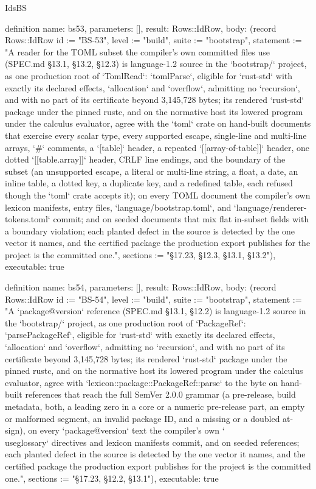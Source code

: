 \begin{lexlean}{IdsBS}
\begin{semanticmodule}
definition{
  name: bs53,
  parameters: [],
  result: Rows::IdRow,
  body: (record Rows::IdRow {id := "BS-53", level := "build", suite := "bootstrap", statement := "A reader for the TOML subset the compiler's own committed files use (SPEC.md §13.1, §13.2, §12.3) is language-1.2 source in the `bootstrap/` project, as one production root of `TomlRead`: `tomlParse`, eligible for `rust-std` with exactly its declared effects, `allocation` and `overflow`, admitting no `recursion`, and with no part of its certificate beyond 3,145,728 bytes; its rendered `rust-std` package under the pinned rustc, and on the normative host its lowered program under the calculus evaluator, agree with the `toml` crate on hand-built documents that exercise every scalar type, every supported escape, single-line and multi-line arrays, `#` comments, a `[table]` header, a repeated `[[array-of-table]]` header, one dotted `[[table.array]]` header, CRLF line endings, and the boundary of the subset (an unsupported escape, a literal or multi-line string, a float, a date, an inline table, a dotted key, a duplicate key, and a redefined table, each refused though the `toml` crate accepts it); on every TOML document the compiler's own lexicon manifests, entry files, `language/bootstrap.toml`, and `language/renderer-tokens.toml` commit; and on seeded documents that mix flat in-subset fields with a boundary violation; each planted defect in the source is detected by the one vector it names, and the certified package the production export publishes for the project is the committed one.", sections := "§17.23, §12.3, §13.1, §13.2"}),
  executable: true
}

definition{
  name: bs54,
  parameters: [],
  result: Rows::IdRow,
  body: (record Rows::IdRow {id := "BS-54", level := "build", suite := "bootstrap", statement := "A `package@version` reference (SPEC.md §13.1, §12.2) is language-1.2 source in the `bootstrap/` project, as one production root of `PackageRef`: `parsePackageRef`, eligible for `rust-std` with exactly its declared effects, `allocation` and `overflow`, admitting no `recursion`, and with no part of its certificate beyond 3,145,728 bytes; its rendered `rust-std` package under the pinned rustc, and on the normative host its lowered program under the calculus evaluator, agree with `lexicon::package::PackageRef::parse` to the byte on hand-built references that reach the full SemVer 2.0.0 grammar (a pre-release, build metadata, both, a leading zero in a core or a numeric pre-release part, an empty or malformed segment, an invalid package ID, and a missing or a doubled at-sign), on every `package@version` text the compiler's own `\\useglossary` directives and lexicon manifests commit, and on seeded references; each planted defect in the source is detected by the one vector it names, and the certified package the production export publishes for the project is the committed one.", sections := "§17.23, §12.2, §13.1"}),
  executable: true
}


\end{semanticmodule}
\end{lexlean}
